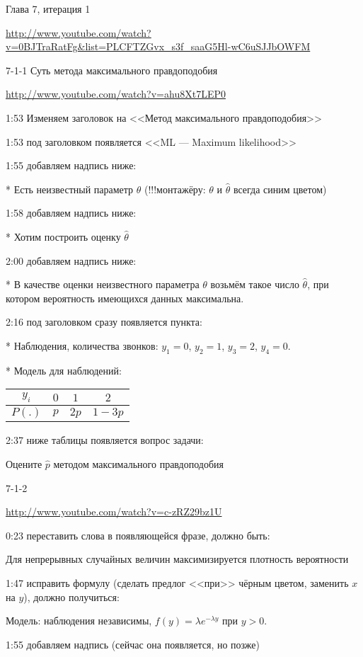 \documentclass[12pt,a4paper]{article}\usepackage[]{graphicx}\usepackage[]{color}
\begin{document}
Глава 7, итерация 1


\url{http://www.youtube.com/watch?v=0BJTraRatFg&list=PLCFTZGvx_s3f_saaG5Hl-wC6uSJJbOWFM}

7-1-1 Суть метода максимального правдоподобия

\url{http://www.youtube.com/watch?v=ahu8Xt7LEP0}

1:53 Изменяем заголовок на <<Метод максимального правдоподобия>>

1:53 под заголовком появляется <<ML --- Maximum likelihood>>

1:55 добавляем надпись ниже:

* Есть неизвестный параметр $\theta$ (!!!монтажёру: $\theta$ и $\hat{\theta}$ всегда синим цветом)

1:58 добавляем надпись ниже:

* Хотим построить оценку $\hat{\theta}$

2:00 добавляем надпись ниже:

* В качестве оценки неизвестного параметра $\theta$ возьмём такое число $\hat{\theta}$, при котором вероятность имеющихся данных максимальна.

2:16 под заголовком сразу появляется пункта:

* Наблюдения, количества звонков: $y_1=0$, $y_2=1$, $y_3=2$, $y_4=0$.

* Модель для наблюдений:

\begin{tabular}{c|ccc}
$y_i$ & $0$ & $1$ & $2$ \\ 
\hline 
$P(.)$ & $p$ & $2p$ & $1-3p$ \\ 
\end{tabular} 

2:37 ниже таблицы появляется вопрос задачи:

Оцените $\hat{p}$ методом максимального правдоподобия

7-1-2

\url{http://www.youtube.com/watch?v=c-zRZ29bz1U}

0:23 переставить слова в появляющейся фразе, должно быть:

Для непрерывных случайных величин максимизируется плотность вероятности

1:47 исправить формулу (сделать предлог <<при>> чёрным цветом, заменить $x$ на $y$), должно получиться:

Модель: наблюдения независимы, $f(y)=\lambda e^{-\lambda y}$ при $y>0$.

1:55 добавляем надпись (сейчас она появляется, но позже)
\end{document}

